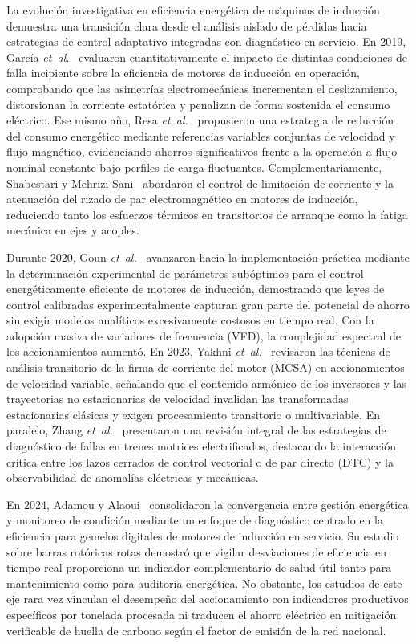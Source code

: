 La evolución investigativa en eficiencia energética de máquinas de inducción demuestra una transición clara desde el análisis aislado de pérdidas hacia estrategias de control adaptativo integradas con diagnóstico en servicio. En 2019, García \emph{et~al.}~\cite{Garcia2019} evaluaron cuantitativamente el impacto de distintas condiciones de falla incipiente sobre la eficiencia de motores de inducción en operación, comprobando que las asimetrías electromecánicas incrementan el deslizamiento, distorsionan la corriente estatórica y penalizan de forma sostenida el consumo eléctrico. Ese mismo año, Resa \emph{et~al.}~\cite{Resa2019} propusieron una estrategia de reducción del consumo energético mediante referencias variables conjuntas de velocidad y flujo magnético, evidenciando ahorros significativos frente a la operación a flujo nominal constante bajo perfiles de carga fluctuantes. Complementariamente, Shabestari y Mehrizi-Sani~\cite{Shabestari2019} abordaron el control de limitación de corriente y la atenuación del rizado de par electromagnético en motores de inducción, reduciendo tanto los esfuerzos térmicos en transitorios de arranque como la fatiga mecánica en ejes y acoples.

Durante 2020, Goun \emph{et~al.}~\cite{Goun2020} avanzaron hacia la implementación práctica mediante la determinación experimental de parámetros subóptimos para el control energéticamente eficiente de motores de inducción, demostrando que leyes de control calibradas experimentalmente capturan gran parte del potencial de ahorro sin exigir modelos analíticos excesivamente costosos en tiempo real. Con la adopción masiva de variadores de frecuencia (VFD), la complejidad espectral de los accionamientos aumentó. En 2023, Yakhni \emph{et~al.}~\cite{Yakhni2023} revisaron las técnicas de análisis transitorio de la firma de corriente del motor (MCSA) en accionamientos de velocidad variable, señalando que el contenido armónico de los inversores y las trayectorias no estacionarias de velocidad invalidan las transformadas estacionarias clásicas y exigen procesamiento transitorio o multivariable. En paralelo, Zhang \emph{et~al.}~\cite{Review2023} presentaron una revisión integral de las estrategias de diagnóstico de fallas en trenes motrices electrificados, destacando la interacción crítica entre los lazos cerrados de control vectorial o de par directo (DTC) y la observabilidad de anomalías eléctricas y mecánicas.

En 2024, Adamou y Alaoui~\cite{Adamou2024} consolidaron la convergencia entre gestión energética y monitoreo de condición mediante un enfoque de diagnóstico centrado en la eficiencia para gemelos digitales de motores de inducción en servicio. Su estudio sobre barras rotóricas rotas demostró que vigilar desviaciones de eficiencia en tiempo real proporciona un indicador complementario de salud útil tanto para mantenimiento como para auditoría energética. No obstante, los estudios de este eje rara vez vinculan el desempeño del accionamiento con indicadores productivos específicos por tonelada procesada ni traducen el ahorro eléctrico en mitigación verificable de huella de carbono según el factor de emisión de la red nacional.

